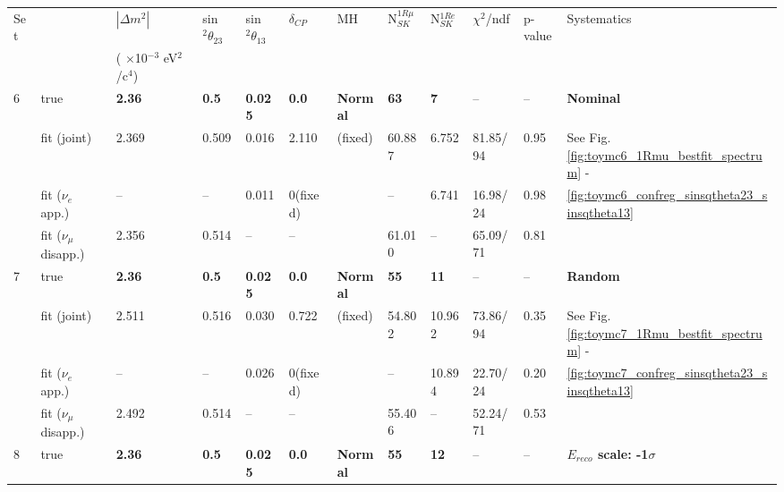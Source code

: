 \begin{table}
\small
\centering
\begin{tabular}{@{}|p{0.1cm}p{2.5cm}|p{1.5cm}p{1cm}p{1cm}p{1cm}|p{1cm}|p{1.0cm}p{1.0cm}|p{1.2cm}p{1.2cm}|p{1.5cm}|@{}}
\hline
Set &   & $|\Delta m^2|$  & sin$^2\theta_{23}$ & sin$^2\theta_{13}$  & $\delta_{CP}$  &  MH & N$_{SK}^{1R\mu}$ & N$_{SK}^{1Re}$ & $\chi^2$/ndf & p-value & Systematics \\
 &   & ( $\times$10$^{-3}$ eV$^{2}$/c$^{4}$) &  &   &  &   &  & &  & &  \\
\hline
6  & true                      & {\bf 2.36 }   & {\bf 0.5}   & {\bf 0.025}   & {\bf 0.0}  & {\bf Normal} & {\bf 63 }   & {\bf 7}    & --        & --   & {\bf Nominal} \\
   & fit (joint)               &    2.369       &  0.509     &   0.016    &   2.110 & (fixed)    &   60.887   &   6.752    &  81.85/94          & 0.95  & See Fig. \ref{fig:toymc6_1Rmu_bestfit_spectrum} -  \\
   & fit ($\nu_{e}$ app.)      & --                             & --         &   0.011    & 0(fixed)  &     & --         &     6.741  &    16.98/24     & 0.98 &  \ref{fig:toymc6_confreg_sinsqtheta23_sinsqtheta13} \\
   & fit ($\nu_{\mu}$ disapp.) &    2.356      &   0.514    & --         & --       &   &   61.010    & --          & 65.09/71    &  0.81 &   \\
\hline
7  & true                      & {\bf 2.36 }   & {\bf 0.5}   & {\bf 0.025}   & {\bf 0.0}  & {\bf Normal} & {\bf 55}   & {\bf 11}    & --          & --   & {\bf Random} \\
   & fit (joint)               &     2.511      &    0.516   &    0.030   &   0.722 & (fixed)    &    54.802  &     10.962  & 73.86/94        & 0.35  & See Fig. \ref{fig:toymc7_1Rmu_bestfit_spectrum} -  \\
   & fit ($\nu_{e}$ app.)      & --                             & --         &    0.026   & 0(fixed)  &     & --         &   10.894    & 22.70/24      & 0.20 &   \ref{fig:toymc7_confreg_sinsqtheta23_sinsqtheta13}\\
   & fit ($\nu_{\mu}$ disapp.) &   2.492       &     0.514  & --         & --       &    &55.406       & --          & 52.24/71    &  0.53  &   \\
   \hline
8  & true                      & {\bf 2.36 }   & {\bf 0.5}   & {\bf 0.025}   & {\bf 0.0}  & {\bf Normal} & {\bf 55}   & {\bf 12}    & --          & --   & {\bf $E_{reco}$ scale: -1$\sigma$} \\

\end{tabular}
\end{table}
